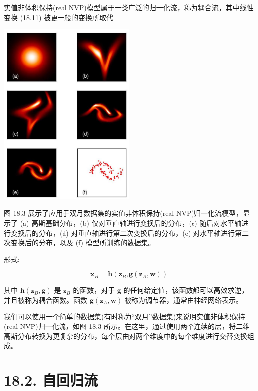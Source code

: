 \documentclass[10pt]{report}
\begin{document}
实值非体积保持(real NVP)模型属于一类广泛的归一化流，称为耦合流，其中线性变换 (18.11) 被更一般的变换所取代

\begin{center}
\includegraphics[max width=0.5\textwidth]{images/0194e279-9b28-703a-88f4-c3ac21e2010d_571_892_349_654_889_0.jpg}
\end{center}
\hspace*{3em} 

图 18.3 展示了应用于双月数据集的实值非体积保持(real NVP)归一化流模型，显示了 (a) 高斯基础分布，(b) 仅对垂直轴进行变换后的分布，(c) 随后对水平轴进行变换后的分布，(d) 对垂直轴进行第二次变换后的分布，(e) 对水平轴进行第二次变换后的分布，以及 (f) 模型所训练的数据集。

形式:

\[
{\mathbf{x}}_{B} = \mathbf{h}\left( {{\mathbf{z}}_{B},\mathbf{g}\left( {{\mathbf{z}}_{A},\mathbf{w}}\right) }\right)  \tag{18.15}
\]

其中 \(\mathbf{h}\left( {{\mathbf{z}}_{B},\mathbf{g}}\right)\) 是 \({\mathbf{z}}_{B}\) 的函数，对于 \(\mathbf{g}\) 的任何给定值，该函数都可以高效求逆，并且被称为耦合函数。函数 \(\mathbf{g}\left( {{\mathbf{z}}_{A},\mathbf{w}}\right)\) 被称为调节器，通常由神经网络表示。

我们可以使用一个简单的数据集(有时称为“双月”数据集)来说明实值非体积保持(real NVP)归一化流，如图 18.3 所示。在这里，通过使用两个连续的层，将二维高斯分布转换为更复杂的分布，每个层由对两个维度中的每个维度进行交替变换组成。

\section*{18.2. 自回归流}
\end{document}
